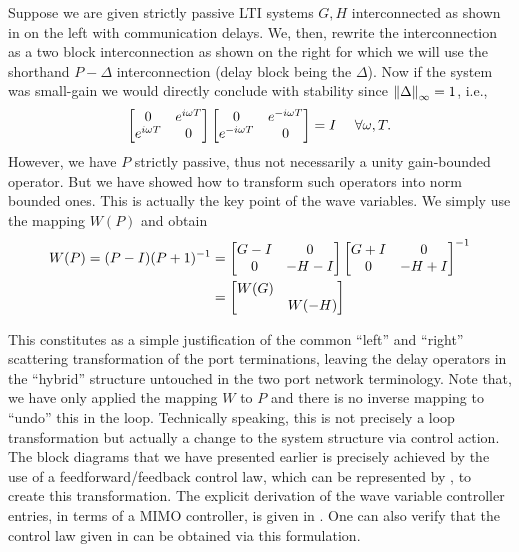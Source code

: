 Suppose we are given strictly passive LTI systems $G,H$ interconnected as shown in  on the 
left with communication delays. We, then, rewrite the interconnection as a two block interconnection as shown on 
the right for which we will use the shorthand $P-\Delta$ interconnection (delay block being the $\Delta$). Now if 
the system was small-gain we would directly conclude with stability since $\displaystyle \left\| \Delta \right\|_\infty = 1$, i.e.,
\[
\begin{bmatrix}0 &e^{i\omega T}\\e^{i\omega T}&0\end{bmatrix}\begin{bmatrix}0 &e^{-i\omega T}\\e^{-i\omega T}&0\end{bmatrix}= I \quad \ \forall\omega,T. 
\]
However, we have $P$ strictly passive, thus not necessarily a unity gain-bounded operator. But we have showed how to transform 
such operators into norm bounded ones. This is actually the key point of the wave variables. We simply use the mapping 
$W(P)$ and obtain 
\begin{align}
W(P) = (P-I)(P+1)^{-1} &= \begin{bmatrix}G-I & 0\\0 &-H-I\end{bmatrix}\begin{bmatrix}G+I & 0\\0 &-H+I\end{bmatrix}^{-1}\\ &= \begin{bmatrix}W(G) &\\&W(-H)\end{bmatrix}
\end{align}

This constitutes as a simple justification of the common ``left'' and ``right'' scattering transformation of the port terminations, leaving 
the delay operators in the ``hybrid'' structure untouched in the two port network terminology. Note that, we have only applied the mapping $W$ to $P$ and 
there is no inverse mapping to ``undo'' this in the loop. Technically speaking, this is not precisely a loop transformation 
but actually a change to the system structure via control action. The block diagrams that we have presented earlier is precisely 
achieved by the use of a feedforward/feedback control law, which can be represented by , to create this 
transformation. The explicit derivation of the wave variable controller entries, in terms of a MIMO controller, is given in 
\cite{christiansson2008}. One can also verify that the control law given in \cite{andersonspong} can be obtained via this formulation. 

